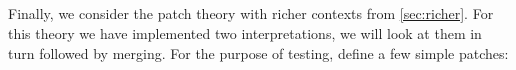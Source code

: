 \begin{code}[hide]%
\>[0]\AgdaSpace{}%
\AgdaSpace{}%
\<%
\\
\>[0][@{}l@{\AgdaIndent{0}}]%
\>[2]\AgdaSpace{}%
\AgdaSpace{}%
\AgdaSpace{}%
\<%
\\
%
\\[\AgdaEmptyExtraSkip]%
%
\>[2]\AgdaSpace{}%
\AgdaSymbol{:}\AgdaSpace{}%
\AgdaSymbol{\{}\AgdaSpace{}%
\AgdaSymbol{:}\AgdaSpace{}%
\AgdaSymbol{\}}\AgdaSpace{}%
\AgdaSpace{}%
\AgdaSymbol{(}\AgdaSpace{}%
\AgdaSymbol{:}\AgdaSpace{}%
\AgdaSymbol{)}\AgdaSpace{}%
\AgdaSpace{}%
\AgdaSpace{}%
\<%
\\
%
\>[2]\AgdaSpace{}%
\AgdaSpace{}%
\AgdaSymbol{=}\AgdaSpace{}%
\AgdaSpace{}%
\AgdaOperator{\AgdaInductiveConstructor{,}}\AgdaSpace{}%
\<%
\end{code}
Finally, we consider the patch theory with richer contexts from \autoref{sec:richer}.
For this theory we have implemented two interpretations, we will look at them in turn
followed by merging. For the purpose of testing, define a few simple patches:
